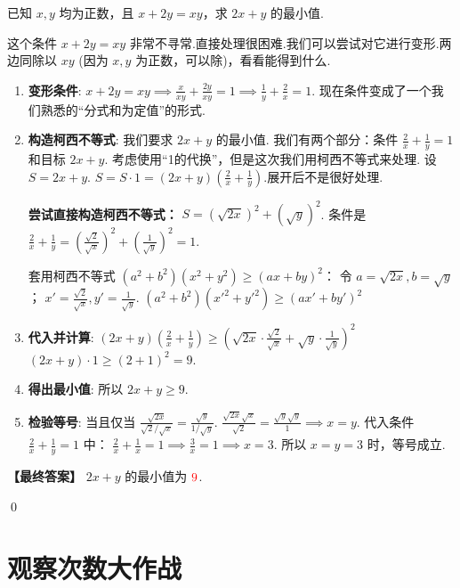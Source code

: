 \begin{exercise}
	已知 $x,y$ 均为正数，且 $x+2y=xy$，求 $2x+y$ 的最小值.
\end{exercise}
\begin{solution}
	\textcolor{green!50!black}{这个条件 $x+2y=xy$ 非常不寻常.直接处理很困难.我们可以尝试对它进行变形.两边同除以 $xy$ (因为 $x,y$ 为正数，可以除)，看看能得到什么.}
	\begin{enumerate}
		\item \textbf{变形条件}:
		$x+2y=xy \implies \frac{x}{xy} + \frac{2y}{xy} = 1 \implies \frac{1}{y} + \frac{2}{x} = 1$.
		\textcolor{green!50!black}{现在条件变成了一个我们熟悉的“分式和为定值”的形式.}
		
		\item \textbf{构造柯西不等式}:
		我们要求 $2x+y$ 的最小值.
		我们有两个部分：条件 $\frac{2}{x}+\frac{1}{y}=1$ 和目标 $2x+y$.
		考虑使用“1的代换”，但是这次我们用柯西不等式来处理.
		设 $S = 2x+y$.
		$S = S \cdot 1 = (2x+y)(\frac{2}{x}+\frac{1}{y})$.展开后不是很好处理.
		
		\textbf{尝试直接构造柯西不等式：}
		$S = (\sqrt{2x})^2 + (\sqrt{y})^2$.
		条件是 $\frac{2}{x}+\frac{1}{y} = (\frac{\sqrt{2}}{\sqrt{x}})^2 + (\frac{1}{\sqrt{y}})^2 = 1$.
		
		套用柯西不等式 $(a^2+b^2)(x^2+y^2) \ge (ax+by)^2$：
		令 $a=\sqrt{2x}, b=\sqrt{y}$； $x'=\frac{\sqrt{2}}{\sqrt{x}}, y'=\frac{1}{\sqrt{y}}$.
		$(a^2+b^2)(x'^2+y'^2) \ge (ax'+by')^2$
		
		\item \textbf{代入并计算}:
		$(2x+y) \left( \frac{2}{x}+\frac{1}{y} \right) \ge \left( \sqrt{2x}\cdot\frac{\sqrt{2}}{\sqrt{x}} + \sqrt{y}\cdot\frac{1}{\sqrt{y}} \right)^2$
		$(2x+y) \cdot 1 \ge (2+1)^2 = 9$.
		
		\item \textbf{得出最小值}:
		所以 $2x+y \ge 9$.
		
		\item \textbf{检验等号}:
		当且仅当 $\frac{\sqrt{2x}}{\sqrt{2}/\sqrt{x}} = \frac{\sqrt{y}}{1/\sqrt{y}}$.
		$\frac{\sqrt{2x}\sqrt{x}}{\sqrt{2}} = \frac{\sqrt{y}\sqrt{y}}{1} \implies x=y$.
		代入条件 $\frac{2}{x}+\frac{1}{y}=1$ 中：
		$\frac{2}{x}+\frac{1}{x}=1 \implies \frac{3}{x}=1 \implies x=3$.
		所以 $x=y=3$ 时，等号成立.
	\end{enumerate}
	\textbf{【最终答案】} $2x+y$ 的最小值为 $\textcolor{red}{9}$.
\end{solution}
\qed

\section{观察次数大作战}


